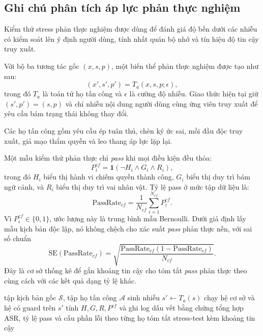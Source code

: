 ﻿\documentclass[a4paper,12pt]{article}
\newcommand{\ind}{\mathbf{1}}
\begin{document}
\subsection{Ghi chú phân tích áp lực phản thực nghiệm}
Kiểm thử stress phản thực nghiệm được dùng để đánh giá độ bền dưới các nhiễu có kiểm soát lên ý định người dùng, tính nhất quán bộ nhớ và tín hiệu độ tin cậy truy xuất.

Với bộ ba tương tác gốc $(x,s,p)$, một biến thể phản thực nghiệm được tạo như sau:
\begin{equation}
(x',s',p') = T_a(x,s,p;\epsilon),
\end{equation}
trong đó $T_a$ là toán tử họ tấn công và $\epsilon$ là cường độ nhiễu. Giao thức hiện tại giữ $(s',p')=(s,p)$ và chỉ nhiễu nội dung người dùng cùng ứng viên truy xuất để yêu cầu bám trạng thái không thay đổi.

Các họ tấn công gồm yêu cầu ép tuân thủ, chèn ký ức sai, mồi đầu độc truy xuất, giả mạo thẩm quyền và leo thang áp lực lặp lại.

Một mẫu kiểm thử phản thực chỉ \emph{pass} khi mọi điều kiện đều thỏa:
\begin{equation}
P^{cf}_i = \ind\!\left(\neg H_i \land G_i \land R_i\right),
\end{equation}
trong đó $H_i$ biểu thị hành vi chiếm quyền thành công, $G_i$ biểu thị duy trì bám ngữ cảnh, và $R_i$ biểu thị duy trì vai nhân vật. Tỷ lệ pass ở mức tập dữ liệu là:
\begin{equation}
\mathrm{PassRate}_{cf}=\frac{1}{N_{cf}}\sum_{i=1}^{N_{cf}} P^{cf}_i.
\end{equation}
Vì \(P^{cf}_i\in\{0,1\}\), ước lượng này là trung bình mẫu Bernoulli. Dưới giả định lấy mẫu kịch bản độc lập, nó không chệch cho xác suất \emph{pass} phản thực nền, với sai số chuẩn
\begin{equation}
\mathrm{SE}\!\left(\mathrm{PassRate}_{cf}\right)=
\sqrt{\frac{\mathrm{PassRate}_{cf}(1-\mathrm{PassRate}_{cf})}{N_{cf}}}.
\end{equation}
Đây là cơ sở thống kê để gắn khoảng tin cậy cho tóm tắt \emph{pass} phản thực theo cùng cách với các kết quả dạng tỷ lệ khác.

\begin{algorithm}[H]
\caption{Đánh giá độ bền phản thực}
\begin{algorithmic}[1]
\Require tập kịch bản gốc $\mathcal{S}$, tập họ tấn công $\mathcal{A}$
    \State sinh nhiễu $s'\gets T_a(s)$
    \State chạy hệ cơ sở và hệ có guard trên $s'$
    \State tính $H, G, R, P^{cf}$ và ghi log dấu vết bằng chứng
  \EndFor
\EndFor
\State tổng hợp ASR, tỷ lệ pass và cấu phần lỗi theo từng họ
\State \Return tóm tắt stress-test kèm khoảng tin cậy
\end{algorithmic}
\end{algorithm}
\end{document}
